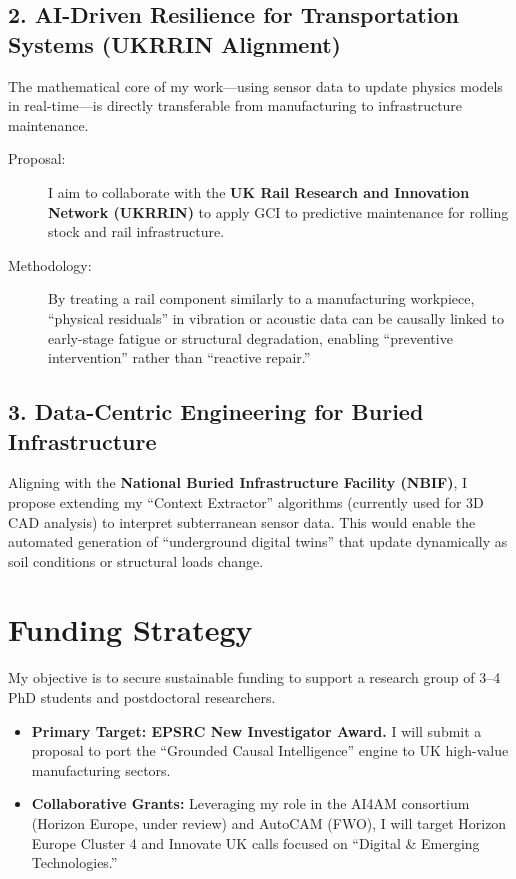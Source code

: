 \documentclass[10pt, a4paper]{article}
\begin{document}
\subsection*{2. AI-Driven Resilience for Transportation Systems (UKRRIN Alignment)}
The mathematical core of my work—using sensor data to update physics models in real-time—is directly transferable from manufacturing to infrastructure maintenance.

\begin{description}
    \item[Proposal:] I aim to collaborate with the \textbf{UK Rail Research and Innovation Network (UKRRIN)} to apply GCI to predictive maintenance for rolling stock and rail infrastructure.
    \item[Methodology:] By treating a rail component similarly to a manufacturing workpiece, ``physical residuals'' in vibration or acoustic data can be causally linked to early-stage fatigue or structural degradation, enabling ``preventive intervention'' rather than ``reactive repair.''
\end{description}

\subsection*{3. Data-Centric Engineering for Buried Infrastructure}
Aligning with the \textbf{National Buried Infrastructure Facility (NBIF)}, I propose extending my ``Context Extractor'' algorithms (currently used for 3D CAD analysis) to interpret subterranean sensor data. This would enable the automated generation of ``underground digital twins'' that update dynamically as soil conditions or structural loads change.

\section*{Funding Strategy}
My objective is to secure sustainable funding to support a research group of 3--4 PhD students and postdoctoral researchers.

\begin{itemize}[leftmargin=*]
    \item \textbf{Primary Target: EPSRC New Investigator Award.} I will submit a proposal to port the ``Grounded Causal Intelligence'' engine to UK high-value manufacturing sectors.
    \item \textbf{Collaborative Grants:} Leveraging my role in the AI4AM consortium (Horizon Europe, under review) and AutoCAM (FWO), I will target Horizon Europe Cluster 4 and Innovate UK calls focused on ``Digital \& Emerging Technologies.''
\end{itemize}
\end{document}
